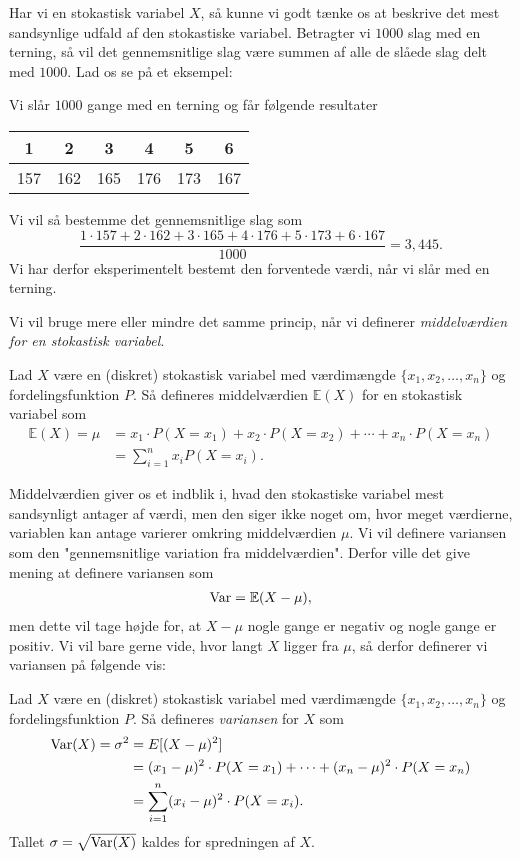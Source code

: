 Har vi en stokastisk variabel $X$, så kunne vi godt tænke os at beskrive det mest sandsynlige udfald af den stokastiske variabel. Betragter vi $1000$ slag med en terning, så vil det gennemsnitlige slag være summen af alle de slåede slag delt med $1000$. Lad os se på et eksempel:
\begin{exa}
Vi slår $1000$ gange med en terning og får følgende resultater
\begin{center}
\begin{tabular}{c|c|c|c|c|c}
1 & 2 & 3 & 4 & 5 & 6 \\
\hline 
157& 162& 165& 176& 173& 167
\end{tabular}
\end{center}
Vi vil så bestemme det gennemsnitlige slag som
\[
\frac{1\cdot 157 + 2\cdot 162 + 3\cdot 165 + 4 \cdot 176 + 5\cdot 173 + 6\cdot 167}{1000} = 3,445.
\]
Vi har derfor eksperimentelt bestemt den forventede værdi, når vi slår med en terning. 
\end{exa}
Vi vil bruge mere eller mindre det samme princip, når vi definerer \textit{middelværdien for en stokastisk variabel}.
\begin{defn}[Middelværdi]
Lad $X$ være en (diskret) stokastisk variabel med værdimængde $\{x_1,x_2,\hdots,x_n\}$ og fordelingsfunktion $P$. Så defineres middelværdien $\mathbb{E}(X)$ for en stokastisk variabel som
\begin{align*}
\mathbb{E}(X) = \mu &= x_1 \cdot P(X = x_1) + x_2 \cdot P(X=x_2) + \cdots + x_n \cdot P(X=x_n)\\
&= \sum_{i=1}^{n} x_i P(X=x_i).
\end{align*} 
\end{defn}
Middelværdien giver os et indblik i, hvad den stokastiske variabel mest sandsynligt antager af værdi, men den siger ikke noget om, hvor meget værdierne, variablen kan antage varierer omkring middelværdien $\mu$. Vi vil definere variansen som den "gennemsnitlige variation fra middelværdien". Derfor ville det give mening at definere variansen som 
\begin{align*}
\textnormal{Var} = \mathbb{E}(X-\mu), 
\end{align*}
men dette vil tage højde for, at $X-\mu$ nogle gange er negativ og nogle gange er positiv. Vi vil bare gerne vide, hvor langt $X$ ligger fra $\mu$, så derfor definerer vi variansen på følgende vis:
\begin{defn}
Lad $X$ være en (diskret) stokastisk variabel med værdimængde $\{x_1,x_2,\hdots,x_n\}$ og fordelingsfunktion $P$. Så defineres \textit{variansen} for $X$ som
\begin{align*}
\textnormal{Var}(X) = \sigma^2 &= E[(X-\mu)^2]\\
&= (x_1-\mu)^2\cdot P(X=x_1) + \cdots + (x_n-\mu)^2 \cdot P(X=x_n)\\
&= \sum_{i=1}^n (x_i-\mu)^2\cdot P(X=x_i).
\end{align*}
Tallet $\sigma = \sqrt{\textnormal{Var}(X)}$ kaldes for spredningen af $X$. 
\end{defn}

